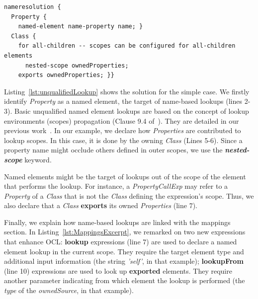 \documentclass{llncs}
\begin{document}
\begin{lstlisting}[caption=Basic name resolution declaration for \textit{Property} elements lookup., label=lst:unqualifiedLookup, language=CS2AS]
nameresolution {
  Property { 
    named-element name-property name; }
  Class {
    for all-children -- scopes can be configured for all-children elements
      nested-scope ownedProperties;
    exports ownedProperties; }}
\end{lstlisting}

Listing~\ref{lst:unqualifiedLookup} shows the solution for the simple case. We firstly identify \textit{Property} as a named element, the target of name-based lookups (lines 2-3). Basic unqualified named element lookups are based on the concept of lookup environments (scopes) propagation (Clause 9.4 of~\cite{omg2014ocl}). They are detailed in our previous work~\cite{sanchez2015oclCS2AS}. In our example, we declare how \textit{Properties} are contributed to lookup scopes. In this case, it is done by the owning \textit{Class} (Lines 5-6). Since a property name might occlude others defined in outer scopes, we use the \textbf{\textit{nested-scope}} keyword. 

Named elements might be the target of lookups out of the scope of the element that performs the lookup. For instance, a \textit{PropertyCallExp} may refer to a \textit{Property} of a \textit{Class} that is not the \textit{Class} defining the expression's scope. Thus, we also declare that a \textit{Class} \textbf{exports} its owned \textit{Properties} (line 7). 

Finally, we explain how name-based lookups are linked with the mappings section. In Listing~\ref{lst:MappingsExcerpt}, we remarked on two new expressions that enhance OCL: \textbf{lookup} expressions (line 7) are used to declare a named element lookup in the current scope. They require the target element type and additional input information (the string \textit{'self'}, in that example); \textbf{lookupFrom} (line 10) expressions are used to look up \textbf{exported} elements. They require another parameter indicating from which element the lookup is performed (the \textit{type} of the \textit{ownedSource}, in that example).


\end{document}
